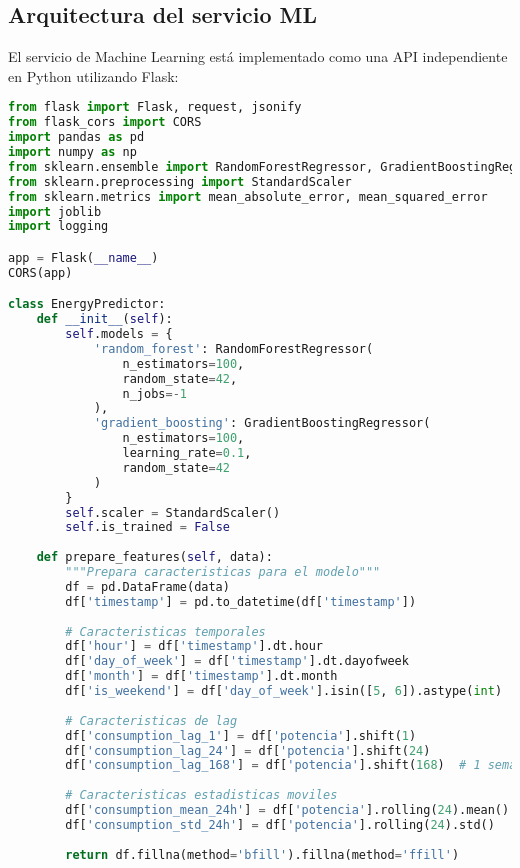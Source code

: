 \subsection{Arquitectura del servicio ML}

El servicio de Machine Learning está implementado como una API independiente en Python utilizando Flask:

\begin{lstlisting}[language=Python, caption=Estructura del servicio ML]
from flask import Flask, request, jsonify
from flask_cors import CORS
import pandas as pd
import numpy as np
from sklearn.ensemble import RandomForestRegressor, GradientBoostingRegressor
from sklearn.preprocessing import StandardScaler
from sklearn.metrics import mean_absolute_error, mean_squared_error
import joblib
import logging

app = Flask(__name__)
CORS(app)

class EnergyPredictor:
    def __init__(self):
        self.models = {
            'random_forest': RandomForestRegressor(
                n_estimators=100,
                random_state=42,
                n_jobs=-1
            ),
            'gradient_boosting': GradientBoostingRegressor(
                n_estimators=100,
                learning_rate=0.1,
                random_state=42
            )
        }
        self.scaler = StandardScaler()
        self.is_trained = False
        
    def prepare_features(self, data):
        """Prepara caracteristicas para el modelo"""
        df = pd.DataFrame(data)
        df['timestamp'] = pd.to_datetime(df['timestamp'])
        
        # Caracteristicas temporales
        df['hour'] = df['timestamp'].dt.hour
        df['day_of_week'] = df['timestamp'].dt.dayofweek
        df['month'] = df['timestamp'].dt.month
        df['is_weekend'] = df['day_of_week'].isin([5, 6]).astype(int)
        
        # Caracteristicas de lag
        df['consumption_lag_1'] = df['potencia'].shift(1)
        df['consumption_lag_24'] = df['potencia'].shift(24)
        df['consumption_lag_168'] = df['potencia'].shift(168)  # 1 semana
        
        # Caracteristicas estadisticas moviles
        df['consumption_mean_24h'] = df['potencia'].rolling(24).mean()
        df['consumption_std_24h'] = df['potencia'].rolling(24).std()
        
        return df.fillna(method='bfill').fillna(method='ffill')
\end{lstlisting}

